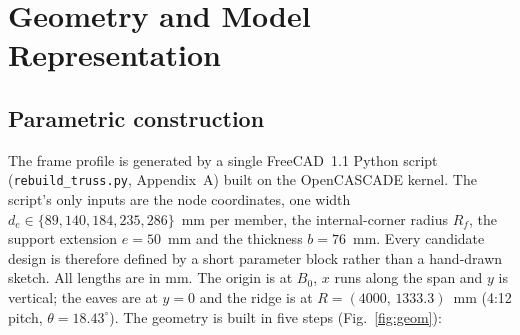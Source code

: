 \section{Geometry and Model Representation}

\subsection{Parametric construction}
The frame profile is generated by a single FreeCAD~1.1 Python script
(\texttt{rebuild\_truss.py}, Appendix~A) built on the OpenCASCADE kernel.
The script's only inputs are the node coordinates, one width
$d_e\in\{89,140,184,235,286\}$~mm per member, the internal-corner radius
$R_f$, the support extension $e=50$~mm and the thickness $b=76$~mm.
Every candidate design is therefore defined by a short parameter block
rather than a hand-drawn sketch. All lengths are in mm. The origin is
at $B_0$, $x$ runs along the span and $y$ is vertical; the eaves are at
$y=0$ and the ridge is at $R=(4000,\,1333.3)$~mm (4:12 pitch,
$\theta=18.43^\circ$). The geometry is built in five steps
(Fig.~\ref{fig:geom}):


